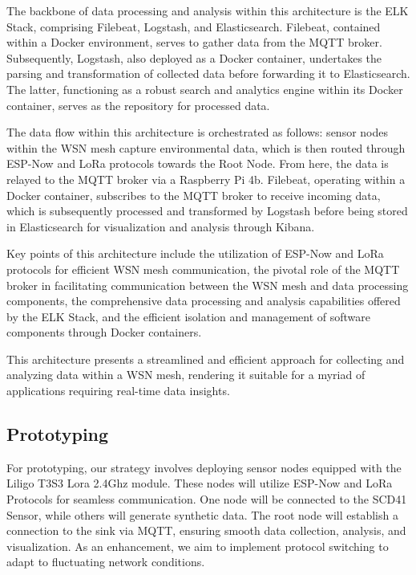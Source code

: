 The backbone of data processing and analysis within this architecture is the ELK Stack, comprising Filebeat, Logstash, and Elasticsearch. Filebeat, contained within a Docker environment, serves to gather data from the MQTT broker. Subsequently, Logstash, also deployed as a Docker container, undertakes the parsing and transformation of collected data before forwarding it to Elasticsearch. The latter, functioning as a robust search and analytics engine within its Docker container, serves as the repository for processed data.

The data flow within this architecture is orchestrated as follows: sensor nodes within the WSN mesh capture environmental data, which is then routed through ESP-Now and LoRa protocols towards the Root Node. From here, the data is relayed to the MQTT broker via a Raspberry Pi 4b. Filebeat, operating within a Docker container, subscribes to the MQTT broker to receive incoming data, which is subsequently processed and transformed by Logstash before being stored in Elasticsearch for visualization and analysis through Kibana.

Key points of this architecture include the utilization of ESP-Now and LoRa protocols for efficient WSN mesh communication, the pivotal role of the MQTT broker in facilitating communication between the WSN mesh and data processing components, the comprehensive data processing and analysis capabilities offered by the ELK Stack, and the efficient isolation and management of software components through Docker containers.

This architecture presents a streamlined and efficient approach for collecting and analyzing data within a WSN mesh, rendering it suitable for a myriad of applications requiring real-time data insights.




\subsection{Prototyping}\label{prototyping}
For prototyping, our strategy involves deploying sensor nodes equipped with the Liligo T3S3 Lora 2.4Ghz module. These nodes will utilize ESP-Now and LoRa Protocols for seamless communication. One node will be connected to the SCD41 Sensor, while others will generate synthetic data. The root node will establish a connection to the sink via MQTT, ensuring smooth data collection, analysis, and visualization. As an enhancement, we aim to implement protocol switching to adapt to fluctuating network conditions.

